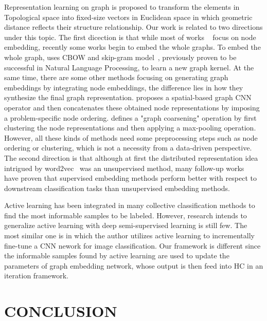 \documentclass[sigconf]{acmart}
\begin{document}
{Representation learning on graph is proposed to transform the elements in Topological space into fixed-size vectors in Euclidean space in which geometric distance reflects their structure relationship. Our work is related to two directions under this topic. The first dicection is that while most of works ~\cite{perozzi2014deepwalk,grover2016node2vec} focus on node embedding, recently some works begin to embed the whole graphs. To embed the whole graph, \cite{Yanardag:2015:DGK:2783258.2783417} uses CBOW and skip-gram model~\cite{mikolov2013distributed}, previously proven to be successful in Natural Language Processing, to learn a new graph kernel. At the same time, there are some other methods focusing on generating graph embeddings by integrating node embeddings, the difference lies in how they synthesize the final graph representation. \cite{Niepert2016LearningCN} proposes a spatial-based graph CNN operator and then concatenates these obtained node representations by imposing a problem-specific node ordering. \cite{defferrard2016convolutional} defines a "graph coarsening" operation by first clustering the node representations and then applying a max-pooling operation. However, all these kinds of methods need some preprocessing steps such as node ordering or clustering, which is not a necessity from a data-driven perspective. The second direction is that although at first the distributed representation idea intrigued by word2vec~\cite{mikolov2013distributed} was an unsupervised method, many follow-up works~\cite{dai2016discriminative,DBLP:journals/corr/LinFSYXZB17} have proven that supervised embedding methods perform better with respect to downstream classification tasks than unsupervised embedding methods.

Active learning has been integrated in many collective classification methods \cite{settles2012active,bilgic2010active} to find the most informable samples to be labeled. However, research intends to generalize active learning with deep semi-supervised learning is still few. The most similar one is \cite{zhou2017fine} in which the author utilizes active learning to incrementally fine-tune a CNN nework for image classification. Our framework is different since the informable samples found by active learning are used to update the parameters of graph embedding network, whose output is then feed into HC in an iteration framework.





\section{CONCLUSION}\label{sec.con}

}
\end{document}
